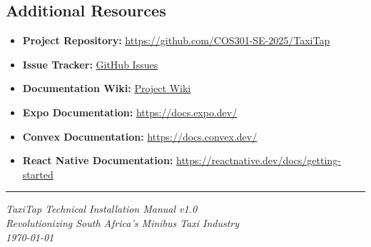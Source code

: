 \documentclass[11pt,a4paper]{article}
\begin{document}
\subsection{Additional Resources}

\begin{itemize}
    \item \textbf{Project Repository:} \href{https://github.com/COS301-SE-2025/TaxiTap}{https://github.com/COS301-SE-2025/TaxiTap}
    \item \textbf{Issue Tracker:} \href{https://github.com/COS301-SE-2025/TaxiTap/issues}{GitHub Issues}
    \item \textbf{Documentation Wiki:} \href{https://github.com/COS301-SE-2025/TaxiTap/wiki}{Project Wiki}
    \item \textbf{Expo Documentation:} \href{https://docs.expo.dev/}{https://docs.expo.dev/}
    \item \textbf{Convex Documentation:} \href{https://docs.convex.dev/}{https://docs.convex.dev/}
    \item \textbf{React Native Documentation:} \href{https://reactnative.dev/docs/getting-started}{https://reactnative.dev/docs/getting-started}
\end{itemize}

\vfill
\hrule
\vspace{0.5cm}
\begin{center}
\textit{TaxiTap Technical Installation Manual v1.0}\\
\textit{Revolutionizing South Africa's Minibus Taxi Industry}\\
\textit{\today}
\end{center}
\end{document}

